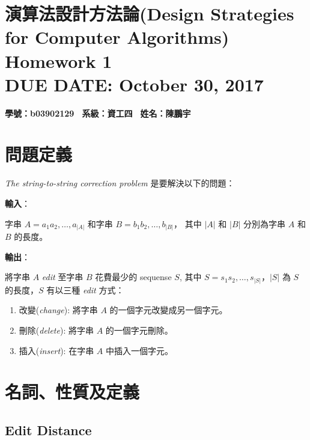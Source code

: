 \documentclass[15pt]{extarticle}
\newcommand{\hmwkClass}{演算法設計方法論(Design Strategies for Computer Algorithms)}
\newcommand{\hmwkTitle}{Homework 1}
\newcommand{\hmwkDueDate}{October 30, 2017}
\begin{document}
\thispagestyle{empty}
\section*{\hmwkClass \\
    \normalsize{\hmwkTitle} \\
    \normalsize{DUE DATE: \hmwkDueDate}
}

\hfill \textbf{學號：b03902129 \, 系級：資工四 \, 姓名：陳鵬宇} \\

\section{問題定義}

\textit{The string-to-string correction problem} 是要解決以下的問題：\\

\begin{minipage}[t][][t]{0.06\textwidth}
\textbf{輸入}：
\end{minipage}
\begin{minipage}[t][][t]{0.9\textwidth}
字串 $A = a_1a_2, \dots, a_{|A|}$ 和字串 $B = b_1b_2, \dots, b_{|B|}$，
其中 $|A|$ 和 $|B|$ 分別為字串 $A$ 和 $B$ 的長度。\\
\end{minipage}

\begin{minipage}[t][][t]{0.06\textwidth}
\textbf{輸出}：
\end{minipage}
\begin{minipage}[t][][t]{0.9\textwidth}
將字串 $A$ \textit{edit} 至字串 $B$ 花費最少的 sequense $S$, 其中 $S = s_1s_2,\dots,s_{|S|}$，$|S|$ 為 $S$ 的長度，$S$ 有以三種 \textit{edit} 方式：
\begin{enumerate}
    \item 改變(\textit{change}): 將字串 $A$ 的一個字元改變成另一個字元。
    \item 刪除(\textit{delete}): 將字串 $A$ 的一個字元刪除。
    \item 插入(\textit{insert}): 在字串 $A$ 中插入一個字元。
\end{enumerate}
\end{minipage}

\section{名詞、性質及定義}

\subsection{Edit Distance}
\end{document}
